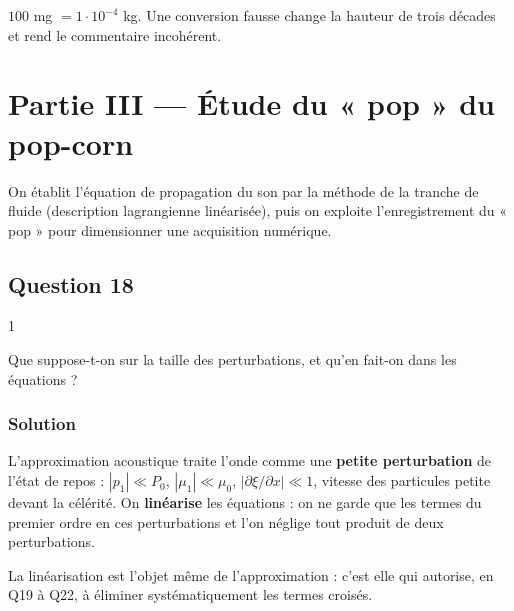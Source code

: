 \documentclass[11pt,a4paper]{article}
\begin{document}
\begin{piege}

\(100\) mg \(=1\cdot10^{-4}\) kg. Une conversion fausse change la hauteur de trois décades et rend le commentaire incohérent.

\end{piege}

\hypertarget{partie-iii-uxe9tude-du-pop-du-pop-corn}{%
\section{Partie III --- Étude du « pop » du pop-corn}\label{partie-iii-uxe9tude-du-pop-du-pop-corn}}

On établit l'équation de propagation du son par la méthode de la tranche de fluide (description lagrangienne linéarisée), puis on exploite l'enregistrement du « pop » pour dimensionner une acquisition numérique.

\hypertarget{question-18}{%
\subsection{Question 18}\label{question-18}}

\begin{indication}{1}

Que suppose-t-on sur la taille des perturbations, et qu'en fait-on dans les équations ?

\end{indication}

\hypertarget{solution-17}{%
\subsubsection{Solution}\label{solution-17}}

L'approximation acoustique traite l'onde comme une \textbf{petite perturbation} de l'état de repos : \(|p_1|\ll P_0\), \(|\mu_1|\ll\mu_0\), \(|\partial\xi/\partial x|\ll1\), vitesse des particules petite devant la célérité. On \textbf{linéarise} les équations : on ne garde que les termes du premier ordre en ces perturbations et l'on néglige tout produit de deux perturbations.

\begin{methode}

La linéarisation est l'objet même de l'approximation : c'est elle qui autorise, en Q19 à Q22, à éliminer systématiquement les termes croisés.

\end{methode}
\end{document}
